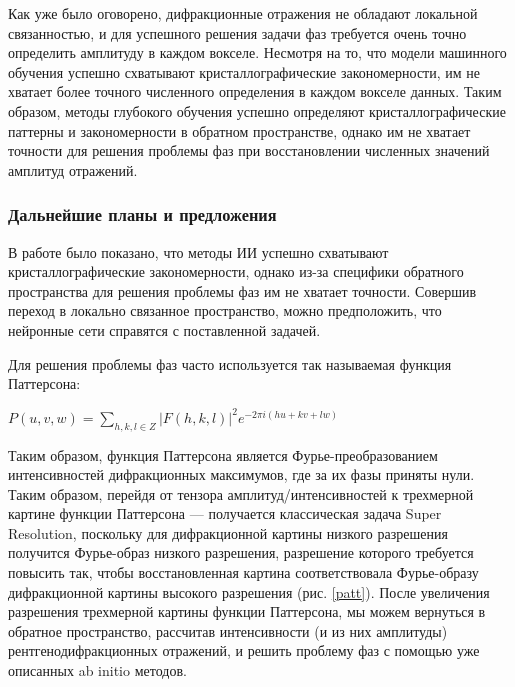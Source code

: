 \documentclass[a4paper,12pt]{article}
\begin{document}
{Как уже было оговорено, дифракционные отражения не обладают локальной связанностью, и для успешного решения задачи фаз требуется очень точно определить амплитуду в каждом вокселе. Несмотря на то, что модели машинного обучения успешно схватывают кристаллографические закономерности, им не хватает более точного численного определения в каждом вокселе данных. Таким образом, методы глубокого обучения успешно определяют кристаллографические паттерны и закономерности в обратном пространстве, однако им не хватает точности для решения проблемы фаз при восстановлении численных значений амплитуд отражений.

\subsubsection*{Дальнейшие планы и предложения}

В работе было показано, что методы ИИ успешно схватывают кристаллографические закономерности, однако из-за специфики обратного пространства для решения проблемы фаз им не хватает точности. Совершив переход в локально связанное пространство, можно предположить, что нейронные сети справятся с поставленной задачей.

Для решения проблемы фаз часто используется так называемая функция Паттерсона:

\begin{center}
    $P(u, v, w) = \sum\limits_{h,k,l\in Z} |F(h,k,l)|^2e^{-2\pi i(hu+kv+lw)}$
\end{center}

Таким образом, функция Паттерсона является Фурье-преобразованием интенсивностей дифракционных максимумов, где за их фазы приняты нули. Таким образом, перейдя от тензора амплитуд/интенсивностей к трехмерной картине функции Паттерсона --- получается классическая задача Super Resolution, поскольку для дифракционной картины низкого разрешения получится Фурье-образ низкого разрешения, разрешение которого требуется повысить так, чтобы восстановленная картина соответствовала Фурье-образу дифракционной картины высокого разрешения (рис. \ref{patt}). После увеличения разрешения трехмерной картины функции Паттерсона, мы можем вернуться в обратное пространство, рассчитав интенсивности (и из них амплитуды) рентгенодифракционных отражений, и решить проблему фаз с помощью уже описанных ab initio методов.

}
\end{document}
